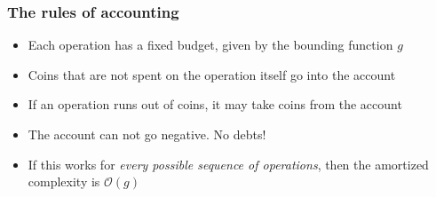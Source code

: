\documentclass[aspectratio=169]{beamer}
\begin{document}
\begin{frame}
  \frametitle{The rules of accounting}
  \begin{itemize}
  \item Each operation has a fixed budget, given by the bounding function $g$
  \item Coins that are not spent on the operation itself go into the account
  \item If an operation runs out of coins, it may take coins from the account
  \item \alert<2>{The account can not go negative. No debts!}
  \item If this works for \textit{every possible sequence of operations}, then the amortized complexity is $\mathcal{O}(g)$
  \end{itemize}
  
\end{frame}
\end{document}
